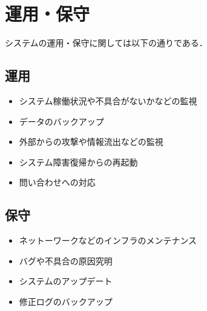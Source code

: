 \section{運用・保守}
システムの運用・保守に関しては以下の通りである．
\subsection{運用}
\begin{itemize}
    \item システム稼働状況や不具合がないかなどの監視
    \item データのバックアップ
    \item 外部からの攻撃や情報流出などの監視
    \item システム障害復帰からの再起動
    \item 問い合わせへの対応
\end{itemize}

\subsection{保守}
\begin{itemize}
    \item ネットーワークなどのインフラのメンテナンス
    \item バグや不具合の原因究明
    \item システムのアップデート
    \item 修正ログのバックアップ
\end{itemize}